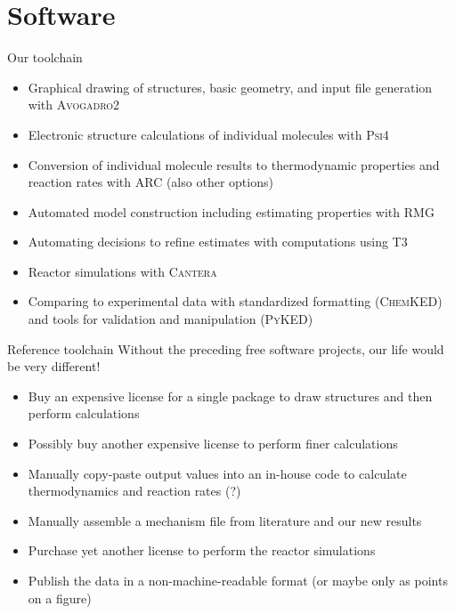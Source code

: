 \section{Software}

\begin{frame}{Our toolchain}
 \begin{itemize}
  \item Graphical drawing of structures, basic geometry, and input file generation with \textsc{Avogadro2}
  \item Electronic structure calculations of individual molecules with \textsc{Psi4}
  \item Conversion of individual molecule results to thermodynamic properties and reaction rates with \textsc{ARC} (also other options)%
  \item Automated model construction including estimating properties with \textsc{RMG}
  \item Automating decisions to refine estimates with computations using \textsc{T3}
  \item Reactor simulations with \textsc{Cantera}
  \item Comparing to experimental data with standardized formatting (\textsc{ChemKED}) and tools for validation and manipulation (\textsc{PyKED})
 \end{itemize}
\end{frame}

\begin{frame}{Reference toolchain}
Without the preceding free software projects, our life would be very different!
 \begin{itemize}
  \item Buy an expensive license for a single package to draw structures and then perform calculations
  \item Possibly buy another expensive license to perform finer calculations
  \item Manually copy-paste output values into an in-house code to calculate thermodynamics and reaction rates (?)
  \item Manually assemble a mechanism file from literature and our new results
  \item Purchase yet another license to perform the reactor simulations
  \item Publish the data in a non-machine-readable format (or maybe only as points on a figure)
 \end{itemize}

 
\end{frame}

